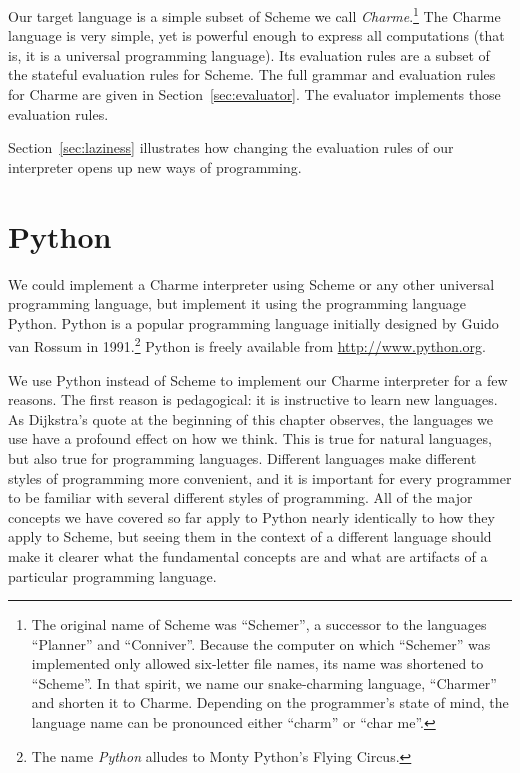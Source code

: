 Our target language is a simple subset of Scheme we call \emph{Charme}.\footnote{The original name of Scheme was ``Schemer'', a successor to the languages ``Planner'' and ``Conniver''.  Because the computer on which ``Schemer'' was implemented only allowed six-letter file names, its name was shortened to ``Scheme''.  In that spirit, we name our snake-charming language, ``Charmer'' and shorten it to Charme.  Depending on the programmer's state of mind, the language name can be pronounced either ``charm'' or ``char me''.}   The Charme language is very simple, yet is powerful enough to express all computations (that is, it is a universal programming language).  Its evaluation rules are a subset of the stateful evaluation rules for Scheme. The full grammar and evaluation rules for Charme are given in Section~\ref{sec:evaluator}.  The evaluator implements those evaluation rules.  

Section~\ref{sec:laziness} illustrates how changing the evaluation rules of our interpreter opens up new ways of programming.

\section{Python}\label{sec:python}

We could implement a Charme interpreter using Scheme or any other universal programming language, but implement it using the programming language Python.  Python is a popular programming language initially designed by Guido van Rossum in 1991.\footnote{The name \emph{Python} alludes to Monty Python's Flying Circus.}  Python is freely available from \url{http://www.python.org}.  

We use Python instead of Scheme to implement our Charme interpreter for a few reasons.  The first reason is pedagogical: it is instructive to learn new languages. As Dijkstra's quote at the beginning of this chapter observes, the languages we use have a profound effect on how we think.  This is true for natural languages, but also true for programming languages.  Different languages make different styles of programming more convenient, and it is important for every programmer to be familiar with several different styles of programming.  All of the major concepts we have covered so far apply to Python nearly identically to how they apply to Scheme, but seeing them in the context of a different language should make it clearer what the fundamental concepts are and what are artifacts of a particular programming language.  

